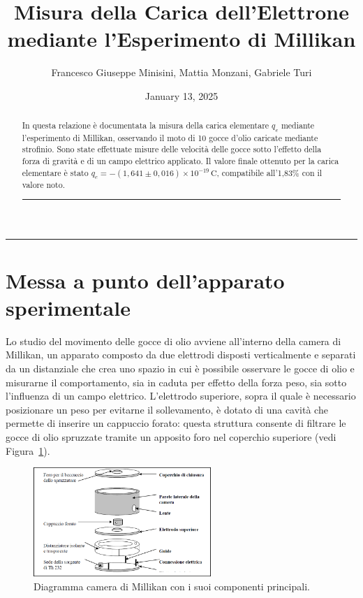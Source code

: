 \documentclass[a4paper,12pt]{article}
\title{Misura della Carica dell'Elettrone mediante l'Esperimento di Millikan}
\author{Francesco Giuseppe Minisini, Mattia Monzani, Gabriele Turi}
\date{January 13, 2025}
\begin{document}
\maketitle
\hrule
\vspace{9pt}
\begin{abstract}
    \noindent
    In questa relazione è documentata la misura della carica elementare \( q_e \) mediante l'esperimento di Millikan, osservando il moto di 10 gocce d'olio caricate mediante strofinio. Sono state effettuate misure delle velocità delle gocce sotto l'effetto della forza di gravità e di un campo elettrico applicato. Il valore finale ottenuto per la carica elementare è stato \( q_e = -(1,641 \pm 0,016) \times 10^{-19} \, \mathrm{C} \), compatibile all'1,83\% con il valore noto.
\vspace{20 pt}
\hrule
\end{abstract}
\vspace{2 pt}


\section{Messa a punto dell'apparato sperimentale}

Lo studio del movimento delle gocce di olio avviene all'interno della camera di Millikan, un apparato composto da due elettrodi disposti verticalmente e separati da un distanziale che crea uno spazio in cui è possibile osservare le gocce di olio e misurarne il comportamento, sia in caduta per effetto della forza peso, sia sotto l'influenza di un campo elettrico. L'elettrodo superiore, sopra il quale è necessario posizionare un peso per evitarne il sollevamento, è dotato di una cavità che permette di inserire un cappuccio forato: questa struttura consente di filtrare le gocce di olio spruzzate tramite un apposito foro nel coperchio superiore (vedi Figura~\ref{fig:camera_millikan}).

\begin{figure}[H]
    \centering
    \includegraphics[width=0.6\textwidth]{Apparato2.png}
    \caption{Diagramma camera di Millikan con i suoi componenti principali.}
    \label{fig:camera_millikan}
\end{figure}
\end{document}
